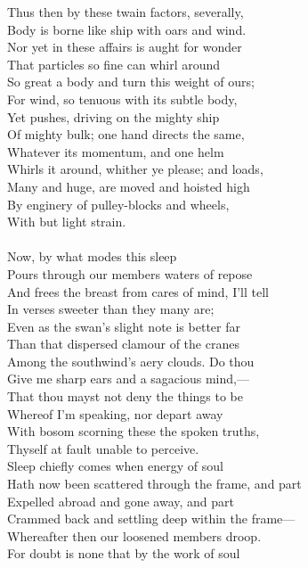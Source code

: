 Thus then by these twain factors, severally,\\
Body is borne like ship with oars and wind.\\
Nor yet in these affairs is aught for wonder\\
That particles so fine can whirl around\\
So great a body and turn this weight of ours;\\
For wind, so tenuous with its subtle body,\\
Yet pushes, driving on the mighty ship\\
Of mighty bulk; one hand directs the same,\\
Whatever its momentum, and one helm\\
Whirls it around, whither ye please; and loads,\\
Many and huge, are moved and hoisted high\\
By enginery of pulley-blocks and wheels,\\
With but light strain.\\
\\
Now, by what modes this sleep\\
Pours through our members waters of repose\\
And frees the breast from cares of mind, I'll tell\\
In verses sweeter than they many are;\\
Even as the swan's slight note is better far\\
Than that dispersed clamour of the cranes\\
Among the southwind's aery clouds. Do thou\\
Give me sharp ears and a sagacious mind,—\\
That thou mayst not deny the things to be\\
Whereof I'm speaking, nor depart away\\
With bosom scorning these the spoken truths,\\
Thyself at fault unable to perceive.\\
Sleep chiefly comes when energy of soul\\
Hath now been scattered through the frame, and part\\
Expelled abroad and gone away, and part\\
Crammed back and settling deep within the frame—\\
Whereafter then our loosened members droop.\\
For doubt is none that by the work of soul\\

